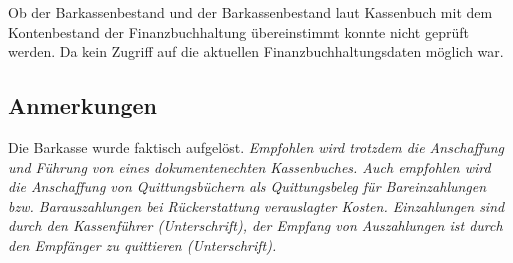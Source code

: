 \documentclass[%
	titlepage,oneside,12pt,headlines=1.5,numbers=noenddot, chapterprefix=false,parskip=full-,DIV=14,pagesize]{scrreprt}
\begin{document}
Ob der Barkassenbestand und der Barkassenbestand laut Kassenbuch mit dem Kontenbestand der Finanzbuchhaltung übereinstimmt konnte nicht geprüft werden. Da kein Zugriff auf die aktuellen Finanzbuchhaltungsdaten möglich war.





\subsection{Anmerkungen}
Die Barkasse wurde faktisch aufgelöst. \textit{Empfohlen wird trotzdem die Anschaffung und Führung von eines dokumentenechten Kassenbuches. Auch empfohlen wird die Anschaffung von Quittungsbüchern als Quittungsbeleg für Bareinzahlungen bzw. Barauszahlungen bei Rückerstattung verauslagter Kosten. Einzahlungen sind durch den Kassenführer (Unterschrift), der Empfang von Auszahlungen ist durch den Empfänger zu quittieren (Unterschrift).}
\end{document}
